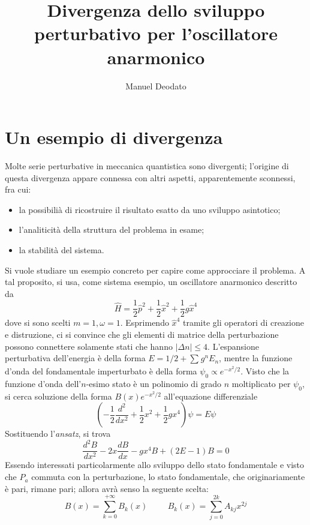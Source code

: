\documentclass[11pt, a4paper]{scrartcl} %
\title{Divergenza dello sviluppo perturbativo per l'oscillatore anarmonico}
\author{Manuel Deodato}
\date{}
\renewcommand{\maketitle}{
\begin{center}
{\sffamily
{\fontsize{20}{20}\selectfont\MakeUppercase\thetitle}}

\vspace{0.2in}

{\large\scshape\sffamily\theauthor}
\end{center}
}
\numberwithin{equation}{section}
\theoremstyle{style2}
\theoremstyle{style1}
\begin{document}
\maketitle
\newpage
\tableofcontents
\newpage
\section{Un esempio di divergenza}
Molte serie perturbative in meccanica quantistica sono divergenti; l'origine di questa divergenza appare connessa con altri aspetti, apparentemente sconnessi, fra cui:
\begin{itemize}
	\item la possibili\`a di ricostruire il risultato esatto da uno sviluppo asintotico;
	\item l'analiticit\`a della struttura del problema in esame;
	\item la stabilit\`a del sistema.
\end{itemize}
Si vuole studiare un esempio concreto per capire come approcciare il problema.
A tal proposito, si usa, come sistema esempio, un oscillatore anarmonico descritto da
\begin{equation}
	\hat{H} = \frac{1}{2}\hat{p}^2 + \frac{1}{2}\hat{x}^2 + \frac{1}{2}g\hat{x}^4
\end{equation}
dove si sono scelti $m=1,\omega =1$.
Esprimendo $\hat{x}^4$ tramite gli operatori di creazione e distruzione, ci si convince che gli elementi di matrice della perturbazione possono connettere solamente stati che hanno $|\Delta  n| \le 4$.
L'espansione perturbativa dell'energia \`e della forma $E = 1/2 + \sum_{}^{} g^n E_n$, mentre la funzione d'onda del fondamentale imperturbato \`e della forma $\psi _0 \propto e^{-  x^2 / 2} $.
Visto che la funzione d'onda dell'$n$-esimo stato \`e un polinomio di grado $n$ moltiplicato per $\psi _0$, si cerca soluzione della forma $B(x) e^{-x^2 / 2} $ all'equazione differenziale
\begin{equation}
\left(	-\frac{1}{2} \frac{d ^2}{d x^2}  + \frac{1}{2}x^2  +\frac{1}{2}gx^4  \right) \psi  = E \psi 
\end{equation}
Sostituendo l'\textit{ansatz}, si trova
\[
\frac{d ^2B}{d x^2} - 2x \frac{d B}{d x}  - gx^4 B + (2E - 1) B = 0
\] 
Essendo interessati particolarmente allo sviluppo dello stato fondamentale e visto che $\hat{P}_a$ commuta con la perturbazione, lo stato fondamentale, che originariamente \`e pari, rimane pari; allora avr\`a senso la seguente scelta: 
\[
B(x) = \sum_{k=0}^{+\infty} B_k(x) \hspace{1cm} B_k(x) = \sum_{j=0}^{2k} A_{kj} x^{2j} 
\] 
\end{document}
